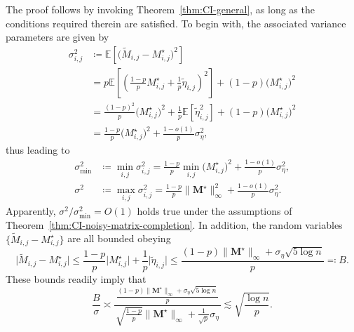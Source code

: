 The proof follows by invoking Theorem~\ref{thm:CI-general}, as long as the conditions required therein are satisfied. 
To begin with, the associated variance parameters are given by
%
\begin{align*}
\sigma_{i,j}^{2} & \coloneqq\mathbb{E}\left[\big(\widetilde{M}_{i,j}-M_{i,j}^{\star}\big)^{2}\right]\\
 & =p\mathbb{E}\left[\left(\frac{1-p}{p}M_{i,j}^{\star}+\frac{1}{p}\widetilde{\eta}_{i,j}\right)^{2}\right]+(1-p)\big(M_{i,j}^{\star}\big)^{2}\\
 & = 
\frac{\left(1-p\right)^{2}}{p} \big(M_{i,j}^{\star}\big)^{2}+\frac{1}{p}\mathbb{E}\left[\widetilde{\eta}_{i,j}^{2}\right]+(1-p)\big(M_{i,j}^{\star}\big)^{2} \\
 & =\frac{1-p}{p}\big(M_{i,j}^{\star}\big)^{2}+\frac{1-o(1)}{p}\sigma_{\eta}^{2}, 
\end{align*}
%
thus leading to
%
\begin{align*}
\sigma_{\min}^{2} & \coloneqq \min_{i,j}\sigma_{i,j}^{2}=\frac{1-p}{p}\min_{i,j}\big(M_{i,j}^{\star}\big)^{2}+\frac{1-o(1)}{p}\sigma_{\eta}^{2},\\
\sigma^{2} & \coloneqq \max_{i,j}\sigma_{i,j}^{2}=\frac{1-p}{p} \|\bm{M}^{\star}\|_{\infty}^2 +\frac{1-o(1)}{p}\sigma_{\eta}^{2}.
\end{align*}
%
Apparently, $\sigma^2/\sigma_{\min}^{2}=O(1)$ holds true under the assumptions of Theorem~\ref{thm:CI-noisy-matrix-completion}. 
In addition, the random variables $\{\widetilde{M}_{i,j}-M_{i,j}^{\star}\}$ are all bounded obeying
%
\[
\big|\widetilde{M}_{i,j}-M_{i,j}^{\star}\big|\leq\frac{1-p}{p}\big|M_{i,j}^{\star}\big|+\frac{1}{p}\big|\widetilde{\eta}_{i,j}\big|
\leq\frac{(1-p)\|\bm{M}^{\star}\|_{\infty}+\sigma_{\eta}\sqrt{5\log n}}{p}\eqqcolon B.
\]
%
These bounds readily imply that
%
\begin{equation}
	\frac{B}{\sigma}\asymp\frac{~\frac{(1-p)\|\bm{M}^{\star}\|_{\infty}+\sigma_{\eta}\sqrt{5\log n}}{p}~}{\sqrt{\frac{1-p}{p}}\|\bm{M}^{\star}\|_{\infty}+\frac{1}{\sqrt{p}}\sigma_{\eta}}\lesssim\sqrt{\frac{\log n}{p}}. 
	\label{eq:B-sigma-ratio-noisy-MC}
\end{equation}
%



